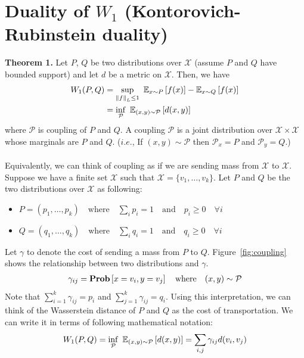 \documentclass[11pt]{article}
\newcommand\bbE{\ensuremath{\mathbb{E}}} %
\newcommand{\norm}[1]{\left\lVert #1 \right\rVert} %
\newcommand{\Prob}{\mathop{\bf Prob}}
\newcommand{\1}{\mathbb{I}} %
\begin{document}
\section{Duality of $W_1$ (Kontorovich-Rubinstein duality)}
\textbf{Theorem 1.} Let $P$, $Q$ be two distributions over $\mathcal{X}$ (assume $P$ and $Q$ have bounded support) and let $d$ be a metric on $\mathcal{X}$. Then, we have
\begin{align}
    W_1(P,Q) &= \underset{\norm{f}_L \le 1}{\sup}  \hspace{0.5em}  \bbE_{x \sim P} \left[ f(x) \right] - \bbE_{x \sim Q} \left[ f(x)\right] \nonumber \\
    &= \underset{\mathcal{P}}{\inf} \hspace{0.5em} \bbE_{(x,y) \sim \mathcal{P}} \left[ d(x,y) \right]
\end{align}
where $\mathcal{P}$ is coupling of $P$ and $Q$. A coupling $\mathcal{P}$ is a joint distribution over $\mathcal{X} \times \mathcal{X}$ whose marginals are $P$ and $Q$. ($i.e.$, If $(x,y) \sim \mathcal{P}$ then $\mathcal{P}_x = P$ and $\mathcal{P}_y = Q$.)\\
\\
Equivalently, we can think of coupling as if we are sending mass from $\mathcal{X} $ to $ \mathcal{X}$. Suppose we have a finite set $\mathcal{X}$ such that $\mathcal{X} = \{v_1,\ldots,v_k \}$. Let $P$ and $Q$ be the two distributions over $\mathcal{X}$ as following:
\begin{itemize}
    \item[] $P = \left( p_1,\ldots, p_k\right) \quad \text{where} \quad \sum_i p_i = 1 \quad \text{and} \quad p_i \ge 0 \quad \forall i$
    \item[] $Q = \left( q_1,\ldots, q_k\right) \quad \text{where} \quad \sum_i q_i = 1 \quad \text{and} \quad q_i \ge 0 \quad \forall i$
\end{itemize}
Let $\gamma$ to denote the cost of sending a mass from $P$ to $Q$. Figure~\ref{fig:coupling} shows the relationship between two distributions and $\gamma$.
\begin{align*}
    \gamma_{ij} = \Prob \left[x = v_i, y=v_j \right] \quad \text{where} \quad (x,y) \sim \mathcal{P}
\end{align*}
Note that $\sum_{i=1}^k \gamma_{ij} = p_i$ and $\sum_{j=1}^k \gamma_{ij} = q_i$. Using this interpretation, we can think of the Wasserstein distance of $P$ and $Q$ as the cost of transportation. We can write it in terms of following mathematical notation:
\begin{align*}
    W_1(P,Q) = \underset{\mathcal{P}}{\inf} \hspace{0.5em} \bbE_{(x,y) \sim \mathcal{P}} \left[ d(x,y) \right] = \sum_{i,j} \gamma_{ij}d(v_i, v_j)
\end{align*}
\end{document}
